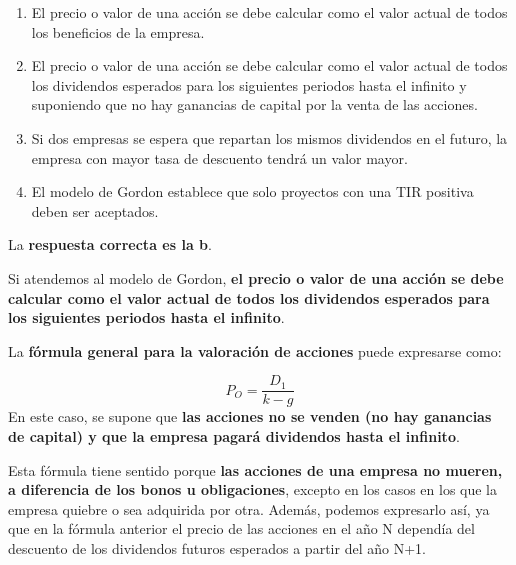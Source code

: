 \documentclass[
  letterpaper,
  DIV=11,
  numbers=noendperiod]{scrreprt}
\begin{document}
\begin{enumerate}
\def\labelenumi{\alph{enumi}.}
\item
  El precio o valor de una acción se debe calcular como el valor actual
  de todos los beneficios de la empresa.
\item
  El precio o valor de una acción se debe calcular como el valor actual
  de todos los dividendos esperados para los siguientes periodos hasta
  el infinito y suponiendo que no hay ganancias de capital por la venta
  de las acciones.
\item
  Si dos empresas se espera que repartan los mismos dividendos en el
  futuro, la empresa con mayor tasa de descuento tendrá un valor mayor.
\item
  El modelo de Gordon establece que solo proyectos con una TIR positiva
  deben ser aceptados.
\end{enumerate}

\begin{tcolorbox}[enhanced jigsaw, left=2mm, opacityback=0, colback=white, breakable, arc=.35mm, bottomrule=.15mm, rightrule=.15mm, toprule=.15mm, leftrule=.75mm, colframe=quarto-callout-tip-color-frame]
\begin{minipage}[t]{5.5mm}
\textcolor{quarto-callout-tip-color}{\faLightbulb}
\end{minipage}%
\begin{minipage}[t]{\textwidth - 5.5mm}

La \textbf{respuesta correcta es la b}.

Si atendemos al modelo de Gordon, \textbf{el precio o valor de una
acción se debe calcular como el valor actual de todos los dividendos
esperados para los siguientes periodos hasta el infinito}.

La \textbf{fórmula general para la valoración de acciones} puede
expresarse como:

\[P_O=\frac{D_1}{k-g}\] En este caso, se supone que \textbf{las acciones
no se venden (no hay ganancias de capital) y que la empresa pagará
dividendos hasta el infinito}.

Esta fórmula tiene sentido porque \textbf{las acciones de una empresa no
mueren, a diferencia de los bonos u obligaciones}, excepto en los casos
en los que la empresa quiebre o sea adquirida por otra. Además, podemos
expresarlo así, ya que en la fórmula anterior el precio de las acciones
en el año N dependía del descuento de los dividendos futuros esperados a
partir del año N+1.

\end{minipage}%
\end{tcolorbox}
\end{document}

